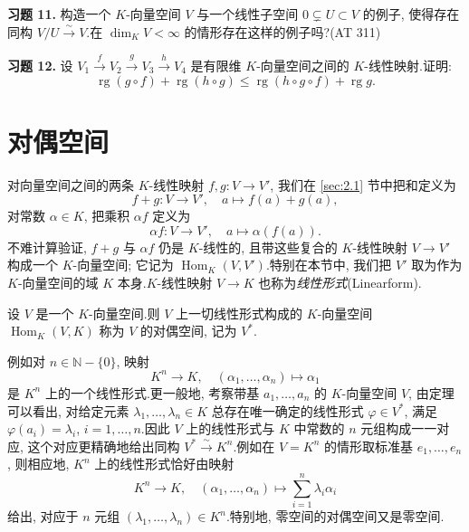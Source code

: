 \noindent\textbf{习题 11.} 构造一个 $K$-向量空间 $V$ 与一个线性子空间 $0 \subsetneq U \subset V$ 的例子, 使得存在同构 $V/U \overset{\sim}{\longrightarrow} V$.在 $\dim_K V < \infty$ 的情形存在这样的例子吗?(AT 311)

\noindent\textbf{习题 12.} 设 $V_1 \xrightarrow{f} V_2 \xrightarrow{g} V_3 \xrightarrow{h} V_4$ 是有限维 $K$-向量空间之间的 $K$-线性映射.证明:
\[
\operatorname{rg}(g \circ f) + \operatorname{rg}(h \circ g) \leq \operatorname{rg}(h \circ g \circ f) + \operatorname{rg} g\text{.}
\]


\section{对偶空间}\label{sec:2.3}

对向量空间之间的两条 $K$-线性映射 $f, g \colon V \longrightarrow V'$, 我们在 \ref{sec:2.1} 节中把和定义为
\[
f + g \colon V \longrightarrow V', \quad a \longmapsto f(a) + g(a),
\]
对常数 $\alpha \in K$, 把乘积 $\alpha f$ 定义为
\[
\alpha f \colon V \longrightarrow V', \quad a \longmapsto \alpha(f(a))\text{.}
\]
不难计算验证, $f + g$ 与 $\alpha f$ 仍是 $K$-线性的, 且带这些复合的 $K$-线性映射 $V \longrightarrow V'$ 构成一个 $K$-向量空间; 它记为 $\operatorname{Hom}_K(V, V')$.特别在本节中, 我们把 $V'$ 取为作为 $K$-向量空间的域 $K$ 本身.$K$-线性映射 $V \longrightarrow K$ 也称为\emph{线性形式}(\textup{Linearform}).

\begin{definition}[对偶空间]\label{def:2.3.1}
设 $V$ 是一个 $K$-向量空间.则 $V$ 上一切线性形式构成的 $K$-向量空间 $\operatorname{Hom}_K(V, K)$ 称为 $V$ 的对偶空间, 记为 $V^*$.
\end{definition}

例如对 $n \in \mathbb{N} - \{0\}$, 映射
\[
K^n \longrightarrow K, \quad (\alpha_1, \ldots, \alpha_n) \longmapsto \alpha_1
\]
是 $K^n$ 上的一个线性形式.更一般地, 考察带基 $a_1, \ldots, a_n$ 的 $K$-向量空间 $V$, 由定理~ 可以看出, 对给定元素 $\lambda_1, \ldots, \lambda_n \in K$ 总存在唯一确定的线性形式 $\varphi \in V^*$, 满足 $\varphi(a_i) = \lambda_i$, $i = 1, \ldots, n$.因此 $V$ 上的线性形式与 $K$ 中常数的 $n$ 元组构成一一对应, 这个对应更精确地给出同构 $V^* \overset{\sim}{\longrightarrow} K^n$.例如在 $V = K^n$ 的情形取标准基 $e_1, \ldots, e_n$, 则相应地, $K^n$ 上的线性形式恰好由映射
\[
K^n \longrightarrow K, \quad (\alpha_1, \ldots, \alpha_n) \longmapsto \sum_{i = 1}^{n} \lambda_i \alpha_i
\]
给出, 对应于 $n$ 元组 $(\lambda_1, \ldots, \lambda_n) \in K^n$.特别地, 零空间的对偶空间又是零空间.


